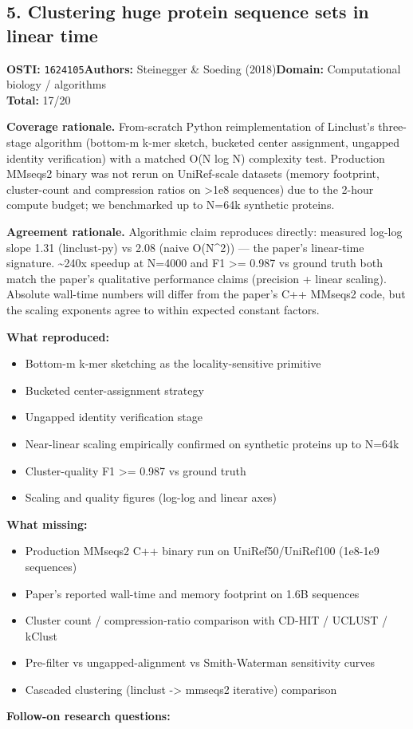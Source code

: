 \subsection{5. Clustering huge protein sequence sets in linear time}
\textbf{OSTI:} \texttt{1624105}\quad\textbf{Authors:} Steinegger \& Soeding (2018)\quad\textbf{Domain:} Computational biology / algorithms\\
\quad{}\quad\textbf{Total:} 17/20\par\smallskip
\noindent\textbf{Coverage rationale.} From-scratch Python reimplementation of Linclust's three-stage algorithm (bottom-m k-mer sketch, bucketed center assignment, ungapped identity verification) with a matched O(N log N) complexity test. Production MMseqs2 binary was not rerun on UniRef-scale datasets (memory footprint, cluster-count and compression ratios on \textgreater{}1e8 sequences) due to the 2-hour compute budget; we benchmarked up to N=64k synthetic proteins.\par
\noindent\textbf{Agreement rationale.} Algorithmic claim reproduces directly: measured log-log slope 1.31 (linclust-py) vs 2.08 (naive O(N\textasciicircum{}2)) --- the paper's linear-time signature. \textasciitilde{}240x speedup at N=4000 and F1 \textgreater{}= 0.987 vs ground truth both match the paper's qualitative performance claims (precision + linear scaling). Absolute wall-time numbers will differ from the paper's C++ MMseqs2 code, but the scaling exponents agree to within expected constant factors.\par\smallskip
\noindent\textbf{What reproduced:}
\begin{itemize}[leftmargin=1.4em,itemsep=0.2em,topsep=0.2em]
\item Bottom-m k-mer sketching as the locality-sensitive primitive
\item Bucketed center-assignment strategy
\item Ungapped identity verification stage
\item Near-linear scaling empirically confirmed on synthetic proteins up to N=64k
\item Cluster-quality F1 \textgreater{}= 0.987 vs ground truth
\item Scaling and quality figures (log-log and linear axes)
\end{itemize}\noindent\textbf{What missing:}
\begin{itemize}[leftmargin=1.4em,itemsep=0.2em,topsep=0.2em]
\item Production MMseqs2 C++ binary run on UniRef50/UniRef100 (1e8-1e9 sequences)
\item Paper's reported wall-time and memory footprint on 1.6B sequences
\item Cluster count / compression-ratio comparison with CD-HIT / UCLUST / kClust
\item Pre-filter vs ungapped-alignment vs Smith-Waterman sensitivity curves
\item Cascaded clustering (linclust -\textgreater{} mmseqs2 iterative) comparison
\end{itemize}\noindent\textbf{Follow-on research questions:}
